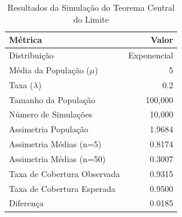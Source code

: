 \begin{table}[h!]
\centering
\caption{Resultados da Simulação do Teorema Central do Limite}
\label{tab:tcl_resultados}
\begin{tabular}{|l|r|}
\hline
\textbf{Métrica} & \textbf{Valor} \\
\hline
Distribuição & Exponencial \\
Média da População ($\mu$) & 5 \\
Taxa ($\lambda$) & 0.2 \\
Tamanho da População & 100,000 \\
Número de Simulações & 10,000 \\
\hline
Assimetria População & 1.9684 \\
Assimetria Médias (n=5) & 0.8174 \\
Assimetria Médias (n=50) & 0.3007 \\
\hline
Taxa de Cobertura Observada & 0.9315 \\
Taxa de Cobertura Esperada & 0.9500 \\
Diferença & 0.0185 \\
\hline
\end{tabular}
\end{table}
